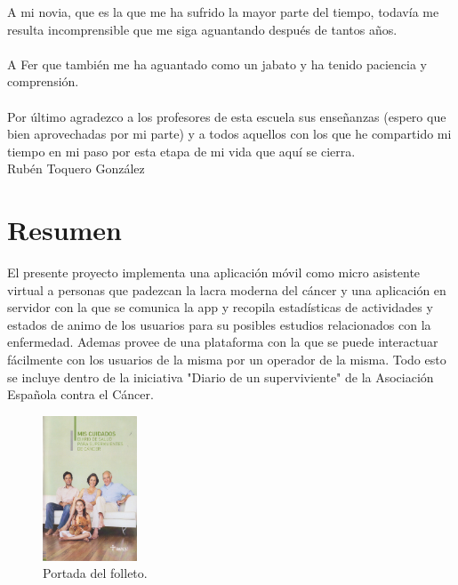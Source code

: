 \documentclass[b5paper,10pt,twoside]{book}
\begin{document}
{		A mi novia, que es la que me ha sufrido la mayor parte del tiempo, todavía me resulta incomprensible que me siga aguantando después de tantos años.\\\\
		A Fer que también me ha aguantado como un jabato y ha tenido paciencia y comprensión.\\\\
		Por último agradezco a los profesores de esta escuela sus enseñanzas (espero que bien aprovechadas por mi parte) y a todos aquellos con los que he compartido mi tiempo en mi paso por esta etapa de mi vida que aquí se cierra.\\
		Rubén Toquero González} 
	

	\chapter*{Resumen}
	 	El presente proyecto implementa una aplicación móvil como micro asistente virtual a personas que padezcan la lacra moderna del cáncer y una aplicación en servidor con la que se comunica la app y recopila estadísticas de actividades y estados de animo de los usuarios para su posibles estudios relacionados con la enfermedad. Ademas provee de una plataforma con la que se puede interactuar fácilmente con los usuarios de la misma por un operador de la misma. Todo esto se incluye dentro de la iniciativa "Diario de un superviviente" de la Asociación Española contra el Cáncer.\\
	 	
	\begin{figure}[h]
		\centering
		\includegraphics[width=0.25\textwidth]{fotointro}
		\caption{Portada del folleto.}
		\label{fig:mesh1}
	\end{figure}
	 
\end{document}
